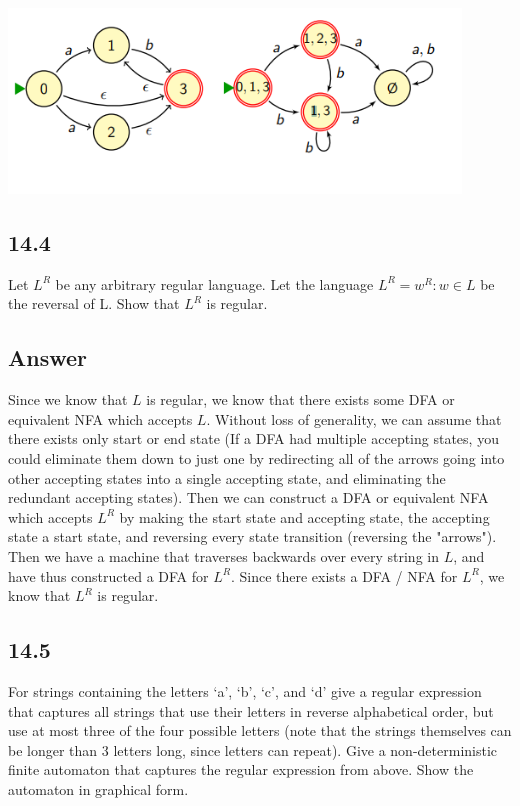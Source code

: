 \documentclass{article}
\begin{document}
\begin{center}
    \includegraphics[width=12cm]{9.png}
\end{center}

\newpage


\subsection{14.4}
Let $L^R$ be any arbitrary regular language. Let the language $L^R = {w^R : w \in L}$ be the reversal of L.
Show that $L^R$ is regular.
\subsection*{Answer}

Since we know that $L$ is regular, we know that there exists some DFA or equivalent NFA which accepts $L$. Without loss of generality, we can
assume that there exists only start or end state (If a DFA had multiple accepting states, you could eliminate them down to just one 
by redirecting all of the arrows going into other accepting states into a single accepting state, and eliminating the redundant accepting
states). Then we can construct a DFA or equivalent NFA which accepts $L^R$ by making the start state and accepting state, the accepting state
a start state, and reversing every state transition (reversing the "arrows"). Then we have a machine that traverses backwards over every
string in $L$, and have thus constructed a DFA for $L^R$. Since there exists a DFA / NFA for $L^R$, we know that $L^R$ is regular.
\newpage
\subsection*{14.5}
 For strings containing the letters ‘a’, ‘b’, ‘c’, and ‘d’ give a regular expression that
captures all strings that use their letters in reverse alphabetical order, but use at most
three of the four possible letters (note that the strings themselves can be longer than
3 letters long, since letters can repeat).
 Give a non-deterministic finite automaton that captures the regular expression from
above. Show the automaton in graphical form.
\newpage
\end{document}
